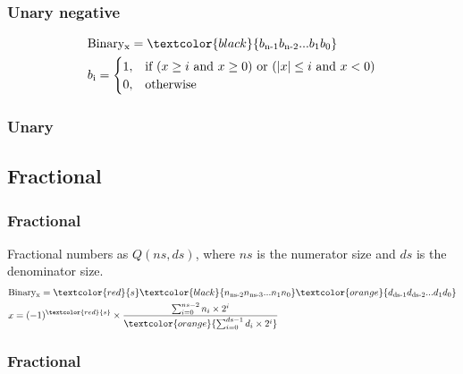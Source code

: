\begin{frame}
    \frametitle{Unary negative}
    \begin{equation}
        \begin{aligned}
            &\text{Binary}\textsubscript{x}=\textcolor{black}{b\textsubscript{n-1}b\textsubscript{n-2}...b\textsubscript{1}b\textsubscript{0}}\\
            &b\textsubscript{i}=
                \begin{cases}
                    1, & \text{if } (x\geq i \text{ and } x \geq 0)  \text{ or } (|x| \leq i \text{ and } x < 0)\\
                    0,& \text{otherwise}\\
                \end{cases}
        \end{aligned}
    \end{equation}
\end{frame}

\begin{frame}
    \frametitle{Unary}
\end{frame}

\subsection{Fractional}
\begin{frame}
    \frametitle{Fractional}
    Fractional numbers as $Q(ns, ds)$, where $ns$ is the numerator size and $ds$ is the denominator size.
    \begin{equation}
        \begin{aligned}
            &\text{Binary}\textsubscript{x}=\textcolor{red}{s}\textcolor{black}{n\textsubscript{ns-2}n\textsubscript{ns-3}...n\textsubscript{1}n\textsubscript{0}}\textcolor{orange}{d\textsubscript{ds-1}d\textsubscript{ds-2}...d\textsubscript{1}d\textsubscript{0}}\\
            &x=(-1)^{\textcolor{red}{s}} \times \frac{\sum_{i=0}^{ns-2} n_i \times 2^i}{\textcolor{orange}{\sum_{i=0}^{ds-1} d_i \times 2^i}}
        \end{aligned}
    \end{equation}
\end{frame}

\begin{frame}
    \frametitle{Fractional}
\end{frame}

